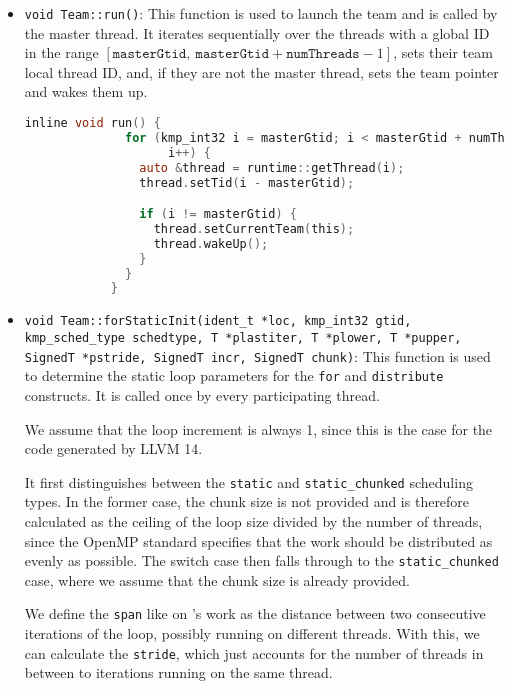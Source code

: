 \begin{itemize}
	\item \texttt{void Team::run()}: This function is used to launch the team and is called by the
	      master thread. It iterates sequentially over the threads with a global ID in the range
	      $[\texttt{masterGtid},\: \texttt{masterGtid} + \texttt{numThreads} - 1]$, sets their team
	      local thread ID, and, if they are not the master thread, sets the team pointer and wakes them
	      up.

	      \begin{lstlisting}[language=C, caption={void Team::run},
          label={lst:team-run}, escapechar=@]
            inline void run() {
              for (kmp_int32 i = masterGtid; i < masterGtid + numThreads;
                    i++) {
                auto &thread = runtime::getThread(i);
                thread.setTid(i - masterGtid);

                if (i != masterGtid) {
                  thread.setCurrentTeam(this);
                  thread.wakeUp();
                }
              }
            }
          \end{lstlisting}

	\item \texttt{void Team::forStaticInit(ident_t *loc, kmp_int32 gtid,\\kmp_sched_type schedtype,
		      T *plastiter, T *plower, T *pupper,\\SignedT *pstride, SignedT incr, SignedT chunk)}:
	      This function is used to determine the static loop parameters for the \texttt{for} and
	      \texttt{distribute} constructs. It is called once by every participating thread.

	      We assume that the loop increment is always 1, since this is the case for the code
	      generated by LLVM 14.

	      It first distinguishes between the \texttt{static} and \texttt{static_chunked} scheduling
	      types. In the former case, the chunk size is not provided and is therefore calculated as
	      the ceiling of the loop size divided by the number of threads, since the OpenMP standard
	      specifies that the work should be distributed as evenly as possible. The switch case then
	      falls through to the \texttt{static_chunked} case, where we assume that the chunk size is
	      already provided.

	      We define the \texttt{span} like on \citeauthor{herokmp}'s work as the distance between two
	      consecutive iterations of the loop, possibly running on different threads. With this, we
	      can calculate the \texttt{stride}, which just accounts for the number of threads in
	      between to iterations running on the same thread.


\end{itemize}
